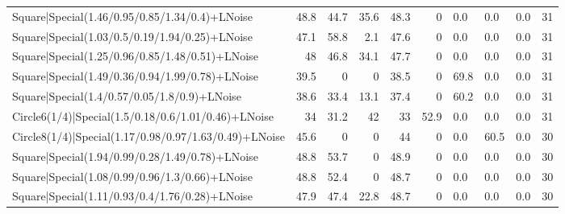 \begin{tabular}{lrrrrrlllr}
 Square|Special(1.46/0.95/0.85/1.34/0.4)+LNoise                  &            48.8 &            44.7 &            35.6 &            48.3 &            0   & 0.0             & 0.0            & 0.0            &           31 \\
 Square|Special(1.03/0.5/0.19/1.94/0.25)+LNoise                  &            47.1 &            58.8 &             2.1 &            47.6 &            0   & 0.0             & 0.0            & 0.0            &           31 \\
 Square|Special(1.25/0.96/0.85/1.48/0.51)+LNoise                 &            48   &            46.8 &            34.1 &            47.7 &            0   & 0.0             & 0.0            & 0.0            &           31 \\
 Square|Special(1.49/0.36/0.94/1.99/0.78)+LNoise                 &            39.5 &             0   &             0   &            38.5 &            0   & 69.8            & 0.0            & 0.0            &           31 \\
 Square|Special(1.4/0.57/0.05/1.8/0.9)+LNoise                    &            38.6 &            33.4 &            13.1 &            37.4 &            0   & 60.2            & 0.0            & 0.0            &           31 \\
 Circle6(1/4)|Special(1.5/0.18/0.6/1.01/0.46)+LNoise             &            34   &            31.2 &            42   &            33   &           52.9 & 0.0             & 0.0            & 0.0            &           31 \\
 Circle8(1/4)|Special(1.17/0.98/0.97/1.63/0.49)+LNoise           &            45.6 &             0   &             0   &            44   &            0   & 0.0             & 60.5           & 0.0            &           30 \\
 Square|Special(1.94/0.99/0.28/1.49/0.78)+LNoise                 &            48.8 &            53.7 &             0   &            48.9 &            0   & 0.0             & 0.0            & 0.0            &           30 \\
 Square|Special(1.08/0.99/0.96/1.3/0.66)+LNoise                  &            48.8 &            52.4 &             0   &            48.7 &            0   & 0.0             & 0.0            & 0.0            &           30 \\
 Square|Special(1.11/0.93/0.4/1.76/0.28)+LNoise                  &            47.9 &            47.4 &            22.8 &            48.7 &            0   & 0.0             & 0.0            & 0.0            &           30 \\

\end{tabular}

